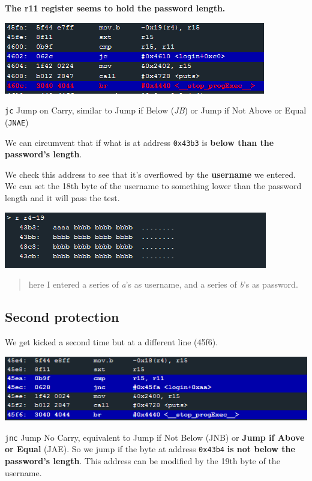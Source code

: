 \documentclass[a4paper,11pt]{article}
\begin{document}
\textbf{The r11 register seems to hold the password length.}

\includegraphics{img/10_1.PNG}

\texttt{jc} Jump on Carry, similar to Jump if Below (\emph{JB}) or Jump
if Not Above or Equal (\texttt{JNAE})

We can circumvent that if what is at address \texttt{0x43b3} is
\textbf{below than the password's length}.

We check this address to see that it's overflowed by the
\textbf{username} we entered. We can set the 18th byte of the username
to something lower than the password length and it will pass the test.

\includegraphics{img/10_2.PNG}

\begin{quote}
here I entered a series of \emph{a}'s as username, and a series of
\emph{b}'s as password.
\end{quote}

\subsection{Second protection}\label{second-protection}

We get kicked a second time but at a different line (45f6).

\includegraphics{img/10_3.PNG}

\texttt{jnc} Jump No Carry, equivalent to Jump if Not Below (JNB) or
\textbf{Jump if Above or Equal} (JAE). So we jump if the byte at address
\texttt{0x43b4} \textbf{is not below the password's length}. This
address can be modified by the 19th byte of the username.
\end{document}
